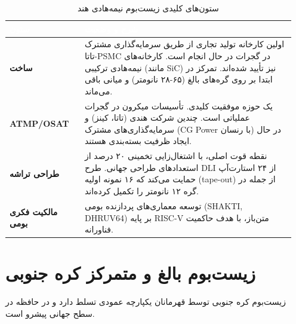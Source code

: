 \documentclass[10pt]{report}
\begin{document}
\begin{table}[H]
    \centering
    \caption{ستون‌های کلیدی زیست‌بوم نیمه‌هادی هند}
    \label{tab:india_ecosystem}
    \begin{tabular}{H{0.25\linewidth} P{0.7\linewidth}}
        \toprule
        \textcolor{white}{\textbf{ستون}} & \textcolor{white}{\textbf{شرح و وضعیت}} \\
        \midrule
        \textbf{ساخت} & اولین کارخانه تولید تجاری از طریق سرمایه‌گذاری مشترک تاتا-PSMC در گجرات در حال انجام است. کارخانه‌های نیمه‌هادی ترکیبی (مانند SiC) نیز تأیید شده‌اند. تمرکز در ابتدا بر روی گره‌های بالغ (۶۵-۲۸ نانومتر) و میانی باقی می‌ماند. \\
        \textbf{ATMP/OSAT} & یک حوزه موفقیت کلیدی. تأسیسات میکرون در گجرات عملیاتی است. چندین شرکت هندی (تاتا، کینز) و سرمایه‌گذاری‌های مشترک (CG Power با رنسان) در حال ایجاد ظرفیت بسته‌بندی هستند. \\
        \textbf{طراحی تراشه} & نقطه قوت اصلی، با اشتغال‌زایی تخمینی ۲۰ درصد از استعدادهای طراحی جهانی. طرح DLI از ۲۴ استارت‌آپ حمایت می‌کند که ۱۶ نمونه اولیه (tape-out) از جمله در گره ۱۲ نانومتر را تکمیل کرده‌اند. \\
        \textbf{مالکیت فکری بومی} & توسعه معماری‌های پردازنده بومی (SHAKTI, DHRUV64) بر پایه RISC-V متن‌باز، با هدف حاکمیت فناورانه. \\
        \bottomrule
    \end{tabular}
\end{table}

\section{زیست‌بوم بالغ و متمرکز کره جنوبی}
زیست‌بوم کره جنوبی توسط قهرمانان یکپارچه عمودی تسلط دارد و در حافظه در سطح جهانی پیشرو است.
\end{document}
